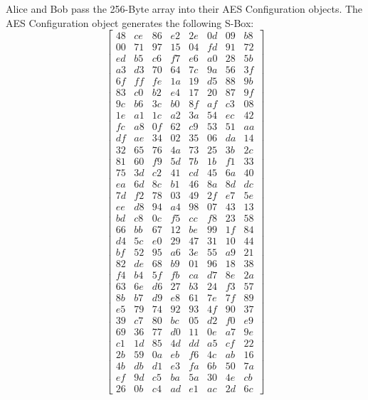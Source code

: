 \documentclass[journal]{IEEEtran}
\begin{document}
Alice and Bob pass the 256-Byte array into their AES Configuration objects. The AES Configuration object generates the following S-Box:
$$
\begin{bmatrix} 
48 & ce & 86 & e2 & 2e & 0d & 09 & b8 \\
00 & 71 & 97 & 15 & 04 & fd & 91 & 72 \\
ed & b5 & c6 & f7 & e6 & a0 & 28 & 5b \\
a3 & d3 & 70 & 64 & 7c & 9a & 56 & 3f \\
6f & ff & fe & 1a & 19 & d5 & 88 & 9b \\
83 & c0 & b2 & e4 & 17 & 20 & 87 & 9f \\
9c & b6 & 3c & b0 & 8f & af & c3 & 08 \\
1e & a1 & 1c & a2 & 3a & 54 & ec & 42 \\
fc & a8 & 0f & 62 & c9 & 53 & 51 & aa \\
df & ae & 34 & 02 & 35 & 06 & da & 14 \\
32 & 65 & 76 & 4a & 73 & 25 & 3b & 2c \\
81 & 60 & f9 & 5d & 7b & 1b & f1 & 33 \\
75 & 3d & c2 & 41 & cd & 45 & 6a & 40 \\
ea & 6d & 8c & b1 & 46 & 8a & 8d & dc \\
7d & f2 & 78 & 03 & 49 & 2f & e7 & 5e \\
ee & d8 & 94 & a4 & 98 & 07 & 43 & 13 \\
bd & c8 & 0c & f5 & cc & f8 & 23 & 58 \\
66 & bb & 67 & 12 & be & 99 & 1f & 84 \\
d4 & 5c & e0 & 29 & 47 & 31 & 10 & 44 \\
bf & 52 & 95 & a6 & 3e & 55 & a9 & 21 \\
82 & de & 68 & b9 & 01 & 96 & 18 & 38 \\
f4 & b4 & 5f & fb & ca & d7 & 8e & 2a \\
63 & 6e & d6 & 27 & b3 & 24 & f3 & 57 \\
8b & b7 & d9 & e8 & 61 & 7e & 7f & 89 \\
e5 & 79 & 74 & 92 & 93 & 4f & 90 & 37 \\
39 & c7 & 80 & bc & 05 & d2 & f0 & e9 \\
69 & 36 & 77 & d0 & 11 & 0e & a7 & 9e \\
c1 & 1d & 85 & 4d & dd & a5 & cf & 22 \\
2b & 59 & 0a & eb & f6 & 4c & ab & 16 \\
4b & db & d1 & e3 & fa & 6b & 50 & 7a \\
ef & 9d & c5 & ba & 5a & 30 & 4e & cb \\
26 & 0b & c4 & ad & e1 & ac & 2d & 6c 
\end{bmatrix}
$$
\end{document}
